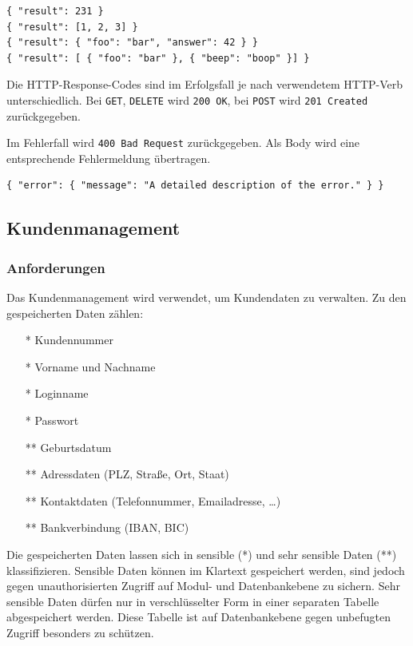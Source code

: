 \documentclass[12pt,a4paper,titlepage,oneside]{scrartcl}
\begin{document}
\begin{lstlisting}
{ "result": 231 }
{ "result": [1, 2, 3] }
{ "result": { "foo": "bar", "answer": 42 } }
{ "result": [ { "foo": "bar" }, { "beep": "boop" }] }
\end{lstlisting}

Die HTTP-Response-Codes sind im Erfolgsfall je nach verwendetem HTTP-Verb
unterschiedlich. Bei \texttt{GET}, \texttt{DELETE} wird \texttt{200 OK}, bei
\texttt{POST} wird \texttt{201 Created} zurückgegeben.

Im Fehlerfall wird \texttt{400 Bad Request} zurückgegeben.
Als Body wird eine entsprechende Fehlermeldung übertragen.

\begin{lstlisting}
{ "error": { "message": "A detailed description of the error." } }
\end{lstlisting}

\subsection{Kundenmanagement}
\subsubsection{Anforderungen}
Das Kundenmanagement wird verwendet, um Kundendaten zu verwalten.
Zu den gespeicherten Daten zählen:

\begin{itemize}
	\item [*] Kundennummer
	\item [*] Vorname und Nachname
	\item [*] Loginname
	\item [*] Passwort
	\item [**] Geburtsdatum
	\item [**] Adressdaten (PLZ, Straße, Ort, Staat)
	\item [**] Kontaktdaten (Telefonnummer, Emailadresse, …)
	\item [**] Bankverbindung (IBAN, BIC)
\end{itemize}

Die gespeicherten Daten lassen sich in sensible (*) und sehr sensible Daten (**) klassifizieren.
Sensible Daten können im Klartext gespeichert werden, sind jedoch gegen unauthorisierten
Zugriff auf Modul- und Datenbankebene zu sichern. Sehr sensible Daten dürfen nur
in verschlüsselter Form in einer separaten Tabelle abgespeichert werden. Diese
Tabelle ist auf Datenbankebene gegen unbefugten Zugriff besonders zu schützen.
\end{document}
